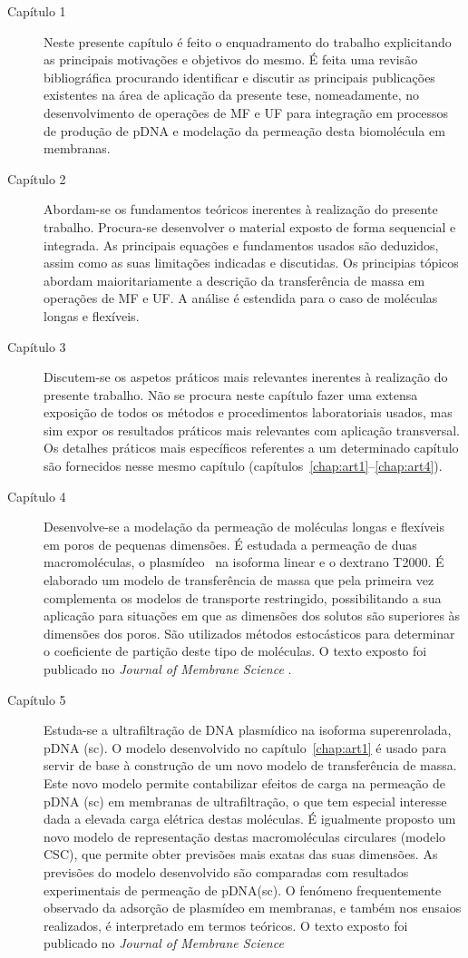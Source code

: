 \begin{description}
	\item[Capítulo 1] Neste presente capítulo é feito o enquadramento do trabalho explicitando as principais motivações e objetivos do mesmo. É feita uma revisão bibliográfica procurando identificar e discutir as principais publicações existentes na área de aplicação da presente tese, nomeadamente, no desenvolvimento de operações de MF e UF para integração em processos de produção de pDNA e modelação da permeação desta biomolécula em membranas. 
	\item[Capítulo 2] Abordam-se os fundamentos teóricos inerentes à realização do presente trabalho. Procura-se desenvolver o material exposto de forma sequencial e integrada. As principais equações e fundamentos usados são deduzidos, assim como as suas limitações indicadas e discutidas. Os principias tópicos abordam maioritariamente a descrição da transferência de massa em operações de MF e UF. A análise é estendida para o caso de moléculas longas e flexíveis.   
	\item[Capítulo 3] Discutem-se os aspetos práticos mais relevantes inerentes à realização do presente trabalho. Não se procura neste capítulo fazer uma extensa exposição de todos os métodos e procedimentos laboratoriais usados, mas sim expor os resultados práticos mais relevantes com aplicação transversal. Os detalhes práticos mais específicos referentes a um determinado capítulo são fornecidos nesse mesmo capítulo (capítulos~\ref{chap:art1}--\ref{chap:art4}). 
	\item[Capítulo 4] Desenvolve-se a modelação da permeação de moléculas longas e flexíveis em poros de pequenas dimensões. É estudada a permeação de duas macromoléculas, o plasmídeo \pUC\ na isoforma linear e o dextrano T2000. É elaborado um modelo de transferência de massa que pela primeira vez complementa os modelos de transporte restringido, possibilitando a sua aplicação para situações em que as dimensões dos solutos são superiores às dimensões dos poros. São utilizados métodos estocásticos para determinar o coeficiente de partição deste tipo de moléculas. O texto exposto foi publicado no \emph{Journal of Membrane Science} \cite{meu1}.
	\item[Capítulo 5] Estuda-se a ultrafiltração de DNA plasmídico na isoforma superenrolada, pDNA (sc). O modelo desenvolvido no capítulo~\ref{chap:art1} é usado para servir de base à construção de um novo modelo de transferência de massa. Este novo modelo permite contabilizar efeitos de carga na permeação de pDNA (sc) em membranas de ultrafiltração, o que tem especial interesse dada a elevada carga elétrica destas moléculas. É igualmente proposto um novo modelo de representação destas macromoléculas circulares (modelo CSC), que permite obter previsões mais exatas das suas dimensões. As previsões do modelo desenvolvido são comparadas com resultados experimentais de permeação de pDNA(sc). O fenómeno frequentemente observado da adsorção de plasmídeo em membranas, e também nos ensaios realizados, é interpretado em termos teóricos. O texto exposto foi publicado no \emph{Journal of Membrane Science} \cite{meu2}

\end{description}
